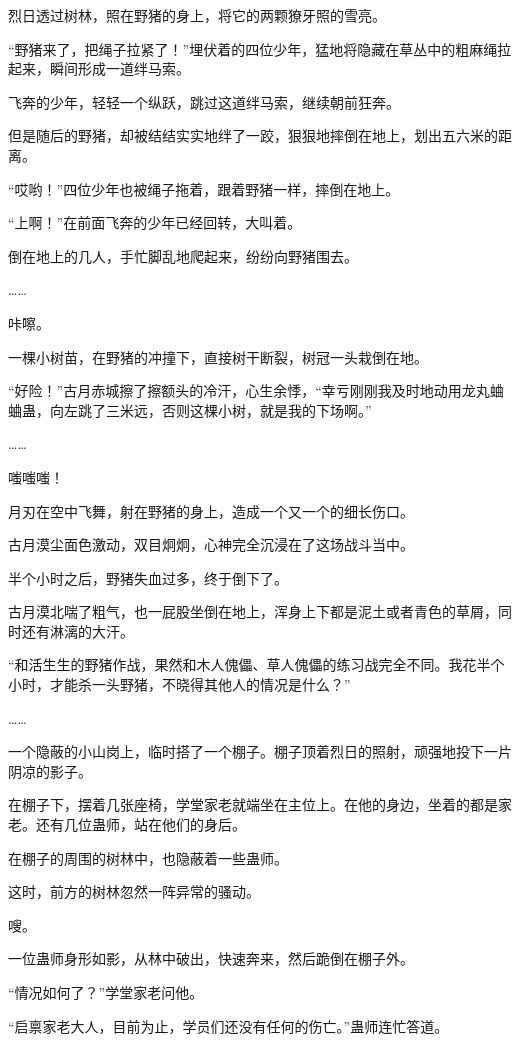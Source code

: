 \begin{this_body}
烈日透过树林，照在野猪的身上，将它的两颗獠牙照的雪亮。

“野猪来了，把绳子拉紧了！”埋伏着的四位少年，猛地将隐藏在草丛中的粗麻绳拉起来，瞬间形成一道绊马索。

飞奔的少年，轻轻一个纵跃，跳过这道绊马索，继续朝前狂奔。

但是随后的野猪，却被结结实实地绊了一跤，狠狠地摔倒在地上，划出五六米的距离。

“哎哟！”四位少年也被绳子拖着，跟着野猪一样，摔倒在地上。

“上啊！”在前面飞奔的少年已经回转，大叫着。

倒在地上的几人，手忙脚乱地爬起来，纷纷向野猪围去。

……

咔嚓。

一棵小树苗，在野猪的冲撞下，直接树干断裂，树冠一头栽倒在地。

“好险！”古月赤城擦了擦额头的冷汗，心生余悸，“幸亏刚刚我及时地动用龙丸蛐蛐蛊，向左跳了三米远，否则这棵小树，就是我的下场啊。”

……

嗤嗤嗤！

月刃在空中飞舞，射在野猪的身上，造成一个又一个的细长伤口。

古月漠尘面色激动，双目炯炯，心神完全沉浸在了这场战斗当中。

半个小时之后，野猪失血过多，终于倒下了。

古月漠北喘了粗气，也一屁股坐倒在地上，浑身上下都是泥土或者青色的草屑，同时还有淋漓的大汗。

“和活生生的野猪作战，果然和木人傀儡、草人傀儡的练习战完全不同。我花半个小时，才能杀一头野猪，不晓得其他人的情况是什么？”

……

一个隐蔽的小山岗上，临时搭了一个棚子。棚子顶着烈日的照射，顽强地投下一片阴凉的影子。

在棚子下，摆着几张座椅，学堂家老就端坐在主位上。在他的身边，坐着的都是家老。还有几位蛊师，站在他们的身后。

在棚子的周围的树林中，也隐蔽着一些蛊师。

这时，前方的树林忽然一阵异常的骚动。

嗖。

一位蛊师身形如影，从林中破出，快速奔来，然后跪倒在棚子外。

“情况如何了？”学堂家老问他。

“启禀家老大人，目前为止，学员们还没有任何的伤亡。”蛊师连忙答道。


\end{this_body}

